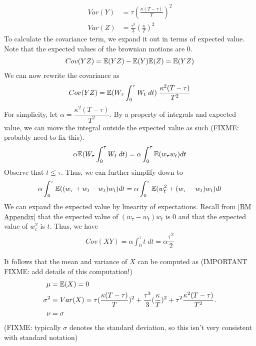 \documentclass[reqno]{amsart}
\begin{document}
\begin{align}
     Var(Y) &= \tau \left(\frac{\kappa(T-\tau)}{T} \right)^2\\
     Var(Z) &= \frac{\tau^3}{3} \left(\frac{\kappa}{T}\right)^2
\end{align}
To calculate the covariance term, we expand it out in terms of expected value.
Note that the expected values of the brownian motions are 0.
\begin{align}
     Cov(YZ) = \mathbb{E}(YZ) - \mathbb{E}(Y)\mathbb{E}(Z) = \mathbb{E}(YZ)
\end{align}
We can now rewrite the covariance as
\begin{align}
     Cov(YZ) = \mathbb{E}(W_\tau \int_0^\tau W_t \; dt) \;\dfrac{\kappa^2 (T - \tau)}{T^2}
\end{align}
For simplicity, let $\alpha = \dfrac{\kappa^2 (T - \tau)}{T^2}$.
By a property of integrals and expected value, we can move the integral outside the expected value as such (FIXME:  probably need to fix this).
\begin{align}
     \alpha \mathbb{E}(W_\tau \int_0^\tau W_t \; dt) = \alpha \int_0^\tau \mathbb{E}(w_\tau w_t) dt
\end{align}
Observe that $t \leq \tau$. Thus, we can further simplify down to
\begin{align}
     \alpha \int_0^\tau \mathbb{E}((w_\tau + w_t - w_t) w_t) dt = \alpha \int_0^\tau \mathbb{E}(w_t^2 + (w_\tau - w_t) w_t) dt
\end{align}
We can expand the expected value by linearity of expectations. 
Recall from \eqref{BM Appendix} that the expected value of $(w_\tau - w_t) w_t$ is $0$ and that the expected value of $w_t^2$ is $t$. Thus, we have
\begin{align}
     Cov(XY) = \alpha \int_0^\tau t \; dt = \alpha \dfrac{\tau^2}{2}
\end{align}

It follows that the mean and variance of $X$ can be computed as (IMPORTANT FIXME: add details of this computation!)
\begin{align}
     \mu &= \mathbb{E}(X) = 0\\
     \sigma^2 &= Var(X) = \tau(\frac{\kappa(T-\tau)}{T})^2 + \frac{\tau^3}{3}(\frac{\kappa}{T})^2 + \tau^2\frac{\kappa^2(T-\tau)}{T^2}.\\
     \nu &= \sigma
\end{align}
(FIXME: typically $\sigma$ denotes the standard deviation, so this isn't very consistent with standard notation)
\end{document}

